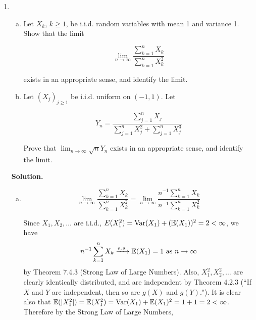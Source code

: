 \begin{enumerate}[(1)]

\item 



\begin{enumerate}[(a)]

\item Let \(X_k\), \(k \geq 1\), be i.i.d. random variables with mean 1 and variance 1. Show that the limit

\[
\lim_{n \to \infty} \frac{\sum_{k=1}^n X_k}{\sum_{k=1}^n X_k^2} 
\]

exists in an appropriate sense, and identify the limit.

\item Let \((X_j)_{j \geq 1}\) be i.i.d. uniform on \((-1, 1)\). Let 

\[
Y_n = \frac{\sum_{j=1}^n X_j}{\sum_{j=1}^n X_j^2 + \sum_{j=1}^n X_j^3} 
\]

Prove that \(\lim_{n \to \infty} \sqrt{n} Y_n\) exists in an appropriate sense, and identify the limit.

\end{enumerate}

\textbf{Solution.} \begin{enumerate}[(a)]

\item 


\[
\lim_{n \to \infty} \frac{\sum_{k=1}^n X_k}{\sum_{k=1}^n X_k^2} = \lim_{n \to \infty} \frac{n^{-1}\sum_{k=1}^n X_k}{n^{-1}\sum_{k=1}^n X_k^2}
\]

Since \(X_1, X_2, \ldots\) are i.i.d., \(E(X_1^2) = \mathrm{Var}(X_1) + (\mathbb{E}(X_1))^2 = 2 < \infty\), we have \[ n^{-1}\sum_{k=1}^n X_k \xrightarrow{a.s.} \mathbb{E}(X_1) = 1 \text{ as } n \to \infty\] by Theorem 7.4.3 (Strong Law of Large Numbers). Also, \(X_1^2, X_2^2, \ldots\) are clearly identically distributed, and are independent by Theorem 4.2.3 (``If \(X\) and \(Y\) are independent, then so are \(g(X)\) and \(g(Y)\)."). It is clear also that \(\mathbb{E}(|X_1^2|) = \mathbb{E}(X_1^2) = \mathrm{Var}(X_1) + \mathbb{E}(X_1)^2 = 1 + 1 = 2 < \infty\). Therefore by the Strong Law of Large Numbers,  


\end{enumerate}
\end{enumerate}
